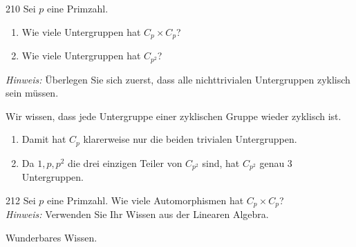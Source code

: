 \begin{algebraUE}{210}
Sei $p$ eine Primzahl.
\begin{enumerate}
  \item Wie viele Untergruppen hat $C_p \times C_p$?
  \item Wie viele Untergruppen hat $C_{p^2}$?
\end{enumerate}
\textit{Hinweis:} Überlegen Sie sich zuerst, dass alle nichttrivialen Untergruppen
zyklisch sein müssen.
\end{algebraUE}
\begin{solution}
Wir wissen, dass jede Untergruppe einer zyklischen Gruppe wieder zyklisch ist.
\begin{enumerate}
  \item Damit hat $C_p$ klarerweise nur die beiden trivialen Untergruppen.
  \item Da $1,p,p^2$ die drei einzigen Teiler von $C_{p^2}$ sind, hat
  $C_{p^2}$ genau 3 Untergruppen.
\end{enumerate}
\end{solution}


\begin{algebraUE}{212}
  Sei $p$ eine Primzahl. Wie viele Automorphismen hat $C_p \times C_p$? \\
  \textit{Hinweis:} Verwenden Sie Ihr Wissen aus der Linearen Algebra.
\end{algebraUE}
\begin{solution}
  Wunderbares Wissen.
\end{solution}
